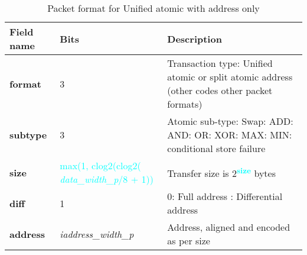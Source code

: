 \begin{table}[htp]
  \centering
  \caption{Packet format for Unified atomic with address only}
  \label{tab:te_datadx0y6}
  \begin{tabulary}{\textwidth}{|l|p{38mm}|p{92mm}|}
    \hline
    {\bf Field name} & {\bf Bits} & {\bf Description} \\
    \hline
    \textbf{format} & 	3	& Transaction type: Unified atomic or split atomic address\newline	
		(other codes other packet formats)\\
    \hline
    \textbf{subtype} & 	3	& Atomic sub-type: Swap: ADD: AND: OR: XOR: MAX: MIN: conditional store failure\\	
    \hline
    \textbf{size} & \textcolor{cyan}{max(1, clog2(clog2( \textit{data\_width\_p}/8 + 1))} & Transfer size is 2\textsuperscript{\textcolor{cyan}{\textbf{size}}} bytes\\
    \hline
    \textbf{diff} & 1 & 0: Full address : Differential address\\
    \hline
    \textbf{address} &  \textit{iaddress\_width\_p} & Address, aligned and encoded as per size \\
    \hline
  \end{tabulary}
\end{table}


